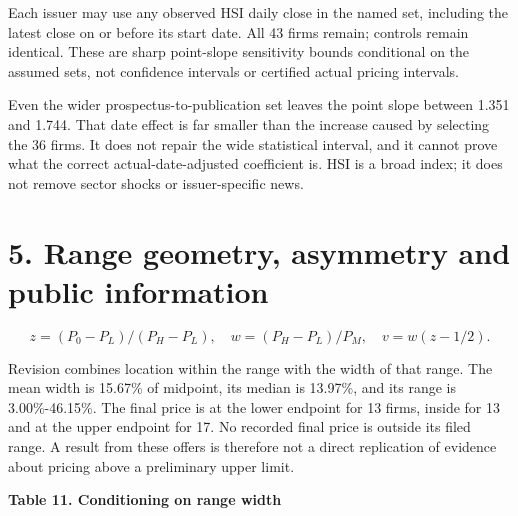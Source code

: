 \documentclass[10pt,a4paper]{article}
\begin{document}
{\footnotesize Each issuer may use any observed HSI daily close in the named set, including the latest close on or before its start date. All 43 firms remain; controls remain identical. These are sharp point-slope sensitivity bounds conditional on the assumed sets, not confidence intervals or certified actual pricing intervals.}\par

Even the wider prospectus-to-publication set leaves the point slope between 1.351 and 1.744. That date effect is far smaller than the increase caused by selecting the 36 firms. It does not repair the wide statistical interval, and it cannot prove what the correct actual-date-adjusted coefficient is. HSI is a broad index; it does not remove sector shocks or issuer-specific news.

\clearpage

\section*{5. Range geometry, asymmetry and public information}

\[
z=(P_0-P_L)/(P_H-P_L),\quad w=(P_H-P_L)/P_M,\quad v=w(z-1/2).
\]

Revision combines location within the range with the width of that range. The mean width is 15.67\% of midpoint, its median is 13.97\%, and its range is 3.00\%-46.15\%. The final price is at the lower endpoint for 13 firms, inside for 13 and at the upper endpoint for 17. No recorded final price is outside its filed range. A result from these offers is therefore not a direct replication of evidence about pricing above a preliminary upper limit.

\par\addvspace{5pt}\textbf{Table 11. Conditioning on range width}\par\nobreak\vspace{2pt}
\end{document}
